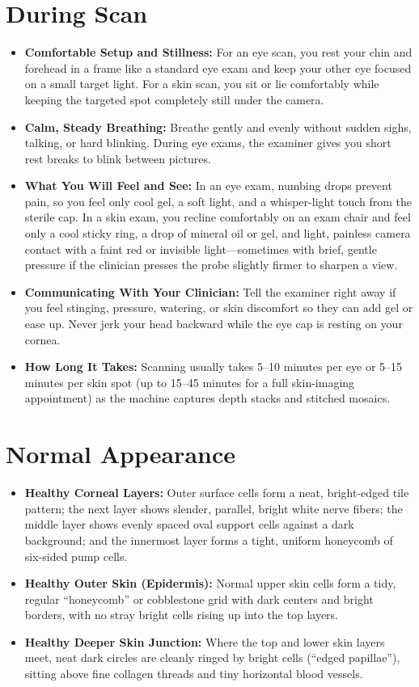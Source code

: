 \section{During Scan}
\begin{itemize}
    \item \textbf{Comfortable Setup and Stillness:} For an eye scan, you rest your chin and forehead in a frame like a standard eye exam and keep your other eye focused on a small target light. For a skin scan, you sit or lie comfortably while keeping the targeted spot completely still under the camera.
    \item \textbf{Calm, Steady Breathing:} Breathe gently and evenly without sudden sighs, talking, or hard blinking. During eye exams, the examiner gives you short rest breaks to blink between pictures.
    \item \textbf{What You Will Feel and See:} In an eye exam, numbing drops prevent pain, so you feel only cool gel, a soft light, and a whisper-light touch from the sterile cap. In a skin exam, you recline comfortably on an exam chair and feel only a cool sticky ring, a drop of mineral oil or gel, and light, painless camera contact with a faint red or invisible light---sometimes with brief, gentle pressure if the clinician presses the probe slightly firmer to sharpen a view.
    \item \textbf{Communicating With Your Clinician:} Tell the examiner right away if you feel stinging, pressure, watering, or skin discomfort so they can add gel or ease up. Never jerk your head backward while the eye cap is resting on your cornea.
    \item \textbf{How Long It Takes:} Scanning usually takes 5--10 minutes per eye or 5--15 minutes per skin spot (up to 15--45 minutes for a full skin-imaging appointment) as the machine captures depth stacks and stitched mosaics.
\end{itemize}

\section{Normal Appearance}
\begin{itemize}
    \item \textbf{Healthy Corneal Layers:} Outer surface cells form a neat, bright-edged tile pattern; the next layer shows slender, parallel, bright white nerve fibers; the middle layer shows evenly spaced oval support cells against a dark background; and the innermost layer forms a tight, uniform honeycomb of six-sided pump cells.
    \item \textbf{Healthy Outer Skin (Epidermis):} Normal upper skin cells form a tidy, regular ``honeycomb'' or cobblestone grid with dark centers and bright borders, with no stray bright cells rising up into the top layers.
    \item \textbf{Healthy Deeper Skin Junction:} Where the top and lower skin layers meet, neat dark circles are cleanly ringed by bright cells (``edged papillae''), sitting above fine collagen threads and tiny horizontal blood vessels.
\end{itemize}


